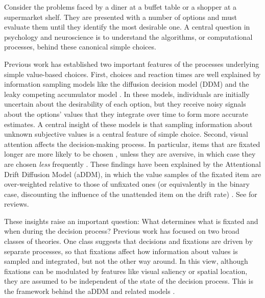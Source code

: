 Consider the problems faced by a diner at a buffet table or a shopper at a supermarket shelf. They are presented with a number of options and must evaluate them until they identify the most desirable one. A central question in psychology and neuroscience is to understand the algorithms, or computational processes, behind these canonical simple choices.

Previous work has established two important features of the processes underlying simple value-based choices. First, choices and reaction times are well explained by information sampling models like the diffusion decision model (DDM) \citep{ratcliff2008diffusion,ratcliff2016diffusion,milosavljevic2010drift} and the leaky competing accumulator model \citep{usher2001time,usher2004loss}. In these models, individuals are initially uncertain about the desirability of each option, but they receive noisy signals about the options' values that they integrate over time to form more accurate estimates. A central insight of these models is that sampling information about unknown subjective values is a central feature of simple choice. Second, visual attention affects the decision-making process. In particular, items that are fixated longer are more likely to be chosen \citep{shimojo2003gaze,armel2008biasing,glaholt2009stimulus,krajbich2010visual,krajbich2011multialternative,cavanagh2014eye,tavares2017attentional,smith2019gaze}, unless they are aversive, in which case they are chosen \emph{less} frequently \citep{armel2008neuroeconomic,armel2008biasing}. These findings have been explained by the Attentional Drift Diffusion Model (aDDM), in which the value samples of the fixated item are over-weighted relative to those of unfixated ones (or equivalently in the binary case, discounting the influence of the unattended item on the drift rate) \citep{krajbich2010visual,krajbich2011multialternative,smith2019gaze,tavares2017attentional}. See \citep{orquin2013attention,krajbich2018accounting} for reviews.

These insights raise an important question: What determines what is fixated and when during the decision process? Previous work has focused on two broad classes of theories. One class suggests that decisions and fixations are driven by separate processes, so that fixations affect how information about values is sampled and integrated, but not the other way around. In this view, although fixations can be modulated by features like visual saliency or spatial location, they are assumed to be independent of the state of the decision process. This is the framework behind the aDDM \citep{krajbich2010visual,krajbich2011multialternative,tavares2017attentional} and related models \citep{gluth2018valuebaseda,towal2013simultaneous,thomas2019gaze}.


